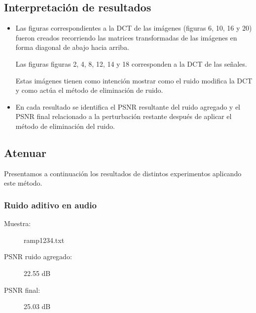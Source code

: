 \documentclass[a4paper,10pt,twoside]{article}
\begin{document}
\subsection{Interpretación de resultados}
\begin{itemize}
\item Las figuras correspondientes a la DCT de las imágenes (figuras 6, 10, 16 y 20) fueron creados recorriendo las matrices transformadas de las imágenes en forma diagonal de abajo hacia arriba.

Las figuras figuras 2, 4, 8, 12, 14 y 18 corresponden a la DCT de las señales.

Estas imágenes tienen como intención mostrar como el ruido modifica la DCT y como actúa el método de eliminación de ruido.
\item En cada resultado se identifica el PSNR resultante del ruido agregado y el PSNR final relacionado a la perturbación restante después de aplicar el método de eliminación del ruido.
\end{itemize}


\subsection{Atenuar}

Presentamos a continuación los resultados de distintos experimentos aplicando este método.

\subsubsection{Ruido aditivo en audio}

\begin{description}
  \item[Muestra:] ramp1234.txt
  \item[PSNR ruido agregado:] 22.55 dB
  \item[PSNR final:] 25.03 dB
\end{description}
\end{document}
